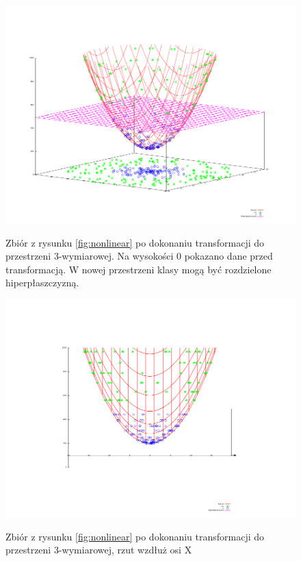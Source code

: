 \begin{figure}[h]
\centering
\includegraphics[scale=0.8]{figures/functions/2-transform}
\label{fig:transform}
\caption{Zbiór z rysunku \ref{fig:nonlinear} po dokonaniu transformacji do przestrzeni 3-wymiarowej. Na wysokości 0 pokazano dane przed transformacją. W nowej przestrzeni klasy mogą być rozdzielone hiperpłaszczyzną.}
\end{figure}

\begin{figure}[h]
\centering
\includegraphics[scale=0.8]{figures/functions/2-transform-side}
\label{fig:transform-side}
\caption{Zbiór z rysunku \ref{fig:nonlinear} po dokonaniu transformacji do przestrzeni 3-wymiarowej, rzut wzdłuż osi X}
\end{figure}


